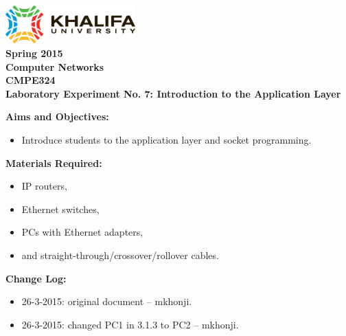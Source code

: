 \documentclass[pdftex,12pt,a4paper]{article}
\begin{document}
    \begin{titlepage}
        \begin{center}
            \includegraphics[width=5cm]{figures/kulogo}\\[1cm]
            {\Large \bfseries
                Spring 2015\\
                Computer Networks\\
                CMPE324\\[1cm]
            }
            {\large \bfseries
                \noindent Laboratory Experiment No. 7: Introduction to the Application Layer\\[1cm]
            }
        \end{center}

        \noindent \textbf{Aims and Objectives:}
            \begin{itemize}[leftmargin=4cm]
                \item Introduce students to the application layer and socket
                programming.
            \end{itemize}
            \vspace{0.5cm}

        \noindent \textbf{Materials Required:}
            \begin{itemize}[leftmargin=4cm]
                \item IP routers,
                \item Ethernet switches,
                \item PCs with Ethernet adapters,
                \item and straight-through/crossover/rollover cables.
            \end{itemize}
            \vspace{0.5cm}

        \noindent \textbf{Change Log:}
            \begin{itemize}[leftmargin=4cm]
                \item 26-3-2015: original document -- mkhonji.
                \item 26-3-2015: changed PC1 in 3.1.3 to PC2 -- mkhonji.
            \end{itemize}
    \end{titlepage}
    \newpage
\end{document}
